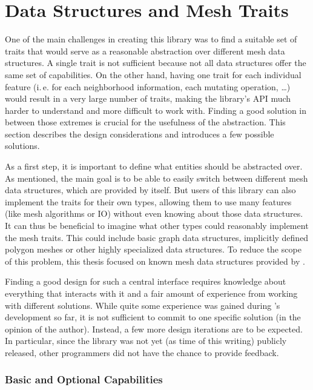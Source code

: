 \section{Data Structures and Mesh Traits}
\label{chap:mesh-traits}

One of the main challenges in creating this library was to find a suitable set of traits that would serve as a reasonable abstraction over different mesh data structures.
A single trait is not sufficient because not all data structures offer the same set of capabilities.
On the other hand, having one trait for each individual feature (i.\,e. for each neighborhood information, each mutating operation, \dots) would result in a very large number of traits, making the library's API much harder to understand and more difficult to work with.
Finding a good solution in between those extremes is crucial for the usefulness of the abstraction.
This section describes the design considerations and introduces a few possible solutions.

As a first step, it is important to define what entities should be abstracted over.
As mentioned, the main goal is to be able to easily switch between different mesh data structures, which are provided by  itself.
But users of this library can also implement the traits for their own types, allowing them to use many features (like mesh algorithms or IO) without  even knowing about those data structures.
It can thus be beneficial to imagine what other types could reasonably implement the mesh traits.
This could include basic graph data structures, implicitly defined polygon meshes or other highly specialized data structures.
To reduce the scope of this problem, this thesis focused on known mesh data structures provided by .

Finding a good design for such a central interface requires knowledge about everything that interacts with it and a fair amount of experience from working with different solutions.
While quite some experience was gained during 's development so far, it is not sufficient to commit to one specific solution (in the opinion of the author).
Instead, a few more design iterations are to be expected.
In particular, since the library was not yet (as time of this writing) publicly released, other programmers did not have the chance to provide feedback.


\subsubsection*{Basic and Optional Capabilities}

